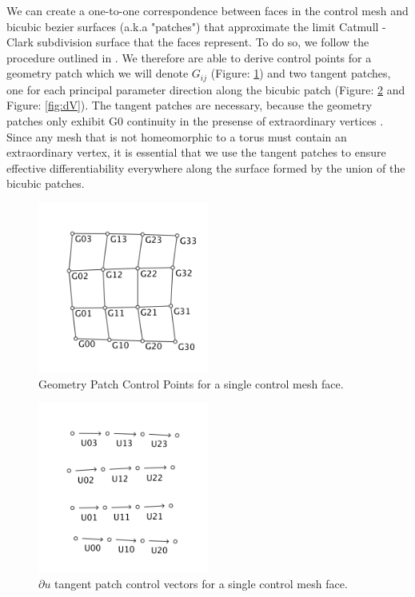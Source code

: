 \documentclass[12pt, letterpaper]{article}
\begin{document}
		We can create a one-to-one correspondence between faces in the control mesh and bicubic bezier surfaces (a.k.a "patches") that approximate the limit Catmull - Clark subdivision surface that the faces represent. To do so, we follow the procedure outlined in \cite{Loop}. We therefore are able to derive control points for a geometry patch which we will denote $G_{ij}$ (Figure: \ref{fig:G}) and two tangent patches, one for each principal parameter direction along the bicubic patch (Figure: \ref{fig:dU} and Figure: \ref{fig:dV}). The tangent patches are necessary, because the geometry patches only exhibit G0 continuity in the presense of extraordinary vertices . Since any mesh that is not homeomorphic to a torus must contain an extraordinary vertex, it is essential that we use the tangent patches to ensure effective differentiability everywhere along the surface formed by the union of the bicubic patches.
		
		\begin{figure}[h]
		\centering
		\includegraphics[width=0.5\textwidth]{GeometryPatchControlPoints}
		\caption{Geometry Patch Control Points for a single control mesh face.}
		\label{fig:G}
		\end{figure}
		
		\begin{figure}[h]
		\centering
		\includegraphics[width=0.5\textwidth]{duPatch}
		\caption{$\partial u$ tangent patch control vectors for a single control mesh face.}
		\label{fig:dU}
		\end{figure}
		
\end{document}
